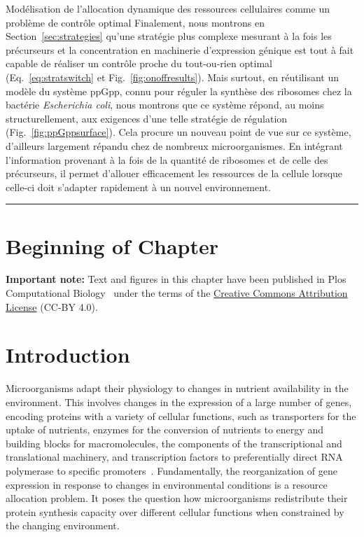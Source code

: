 \begin{chapter_summary}{Modélisation de l'allocation dynamique des ressources cellulaires comme un problème de contrôle optimal}
Finalement, nous montrons en Section~\ref{sec:strategies} qu'une stratégie plus complexe mesurant à la fois les précurseurs et la concentration en machinerie d'expression génique est tout à fait capable de réaliser un contrôle proche du tout-ou-rien optimal (Eq.~\ref{eq:stratswitch} et Fig.~\ref{fig:onoffresults}).
Mais surtout, en réutilisant un modèle du système ppGpp, connu pour réguler la synthèse des ribosomes chez la bactérie \textit{Escherichia coli}, nous montrons que ce système répond, au moins structurellement, aux exigences d'une telle stratégie de régulation (Fig.~\ref{fig:ppGppsurface}).
Cela procure un nouveau point de vue sur ce système, d'ailleurs largement répandu chez de nombreux microorganismes.
En intégrant l'information provenant à la fois de la quantité de ribosomes et de celle des précurseurs, il permet d'allouer efficacement les ressources de la cellule lorsque celle-ci doit s'adapter rapidement à un nouvel environnement.
\end{chapter_summary}

\begin{center}
\noindent\rule{4cm}{0.1pt}
\end{center}

\section*{Beginning of Chapter \thechapter}

\noindent \textbf{Important note:} Text and figures in this chapter have been published in Plos Computational Biology~\cite{giordano_dynamical_2016} under the terms of the \href{https://creativecommons.org/licenses/by/4.0/}{Creative Commons Attribution License} (CC-BY 4.0).

\section{Introduction}

Microorganisms adapt their physiology to changes in nutrient availability in the environment.
This involves changes in the expression of a large number of genes, encoding proteins with a variety of cellular functions, such as transporters for the uptake of nutrients, enzymes for the conversion of nutrients to energy and building blocks for macromolecules, the components of the transcriptional and translational machinery, and transcription factors to preferentially direct RNA polymerase to specific promoters~\cite{schaechter_microbe_2006,keseler_ecocyc_2013}.
Fundamentally, the reorganization of gene expression in response to changes in environmental conditions is a resource allocation problem.
It poses the question how microorganisms redistribute their protein synthesis capacity over different cellular functions when constrained by the changing environment.

